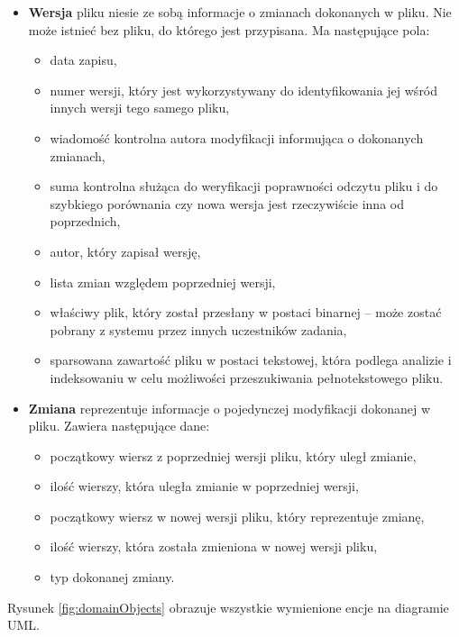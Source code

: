 \begin{itemize}
    \item \textbf{Wersja} pliku niesie ze sobą informacje o zmianach dokonanych w pliku.
    Nie może istnieć bez pliku, do którego jest przypisana.
    Ma następujące pola:
    \begin{itemize}
        \item data zapisu,
        \item numer wersji, który jest wykorzystywany do identyfikowania jej wśród innych wersji tego samego pliku,
        \item wiadomość kontrolna autora modyfikacji informująca o dokonanych zmianach,
        \item suma kontrolna służąca do weryfikacji poprawności odczytu pliku i do szybkiego porównania czy nowa wersja jest rzeczywiście inna od poprzednich,
        \item autor, który zapisał wersję,
        \item lista zmian względem poprzedniej wersji,
        \item właściwy plik, który został przesłany w postaci binarnej -- może zostać pobrany z systemu przez innych uczestników zadania,
        \item sparsowana zawartość pliku w postaci tekstowej, która podlega analizie i indeksowaniu w celu możliwości przeszukiwania pełnotekstowego pliku.
    \end{itemize}
    
    \item \textbf{Zmiana} reprezentuje informacje o pojedynczej modyfikacji dokonanej w pliku.
    Zawiera następujące dane:
    \begin{itemize}
        \item początkowy wiersz z poprzedniej wersji pliku, który uległ zmianie,
        \item ilość wierszy, która uległa zmianie w poprzedniej wersji,
        \item początkowy wiersz w nowej wersji pliku, który reprezentuje zmianę,
        \item ilość wierszy, która została zmieniona w nowej wersji pliku,
        \item typ dokonanej zmiany.
    \end{itemize}
\end{itemize}

Rysunek \ref{fig:domainObjects} obrazuje wszystkie wymienione encje na diagramie UML.

